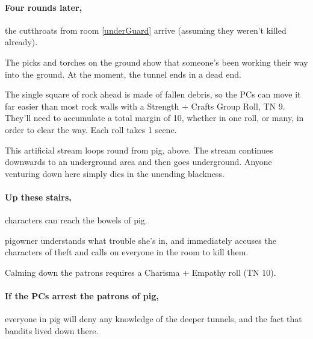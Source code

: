 \begin{multicols}{2}
\sewerking


\paragraph{Four rounds later,}
the cutthroats from room \ref{underGuard} arrive (assuming they weren't killed already).

\label{citadelTunnel}

\begin{boxtext}
  The picks and torches on the ground show that someone's been working their way into the ground.  At the moment, the tunnel ends in a dead end.
\end{boxtext}
 
The single square of rock ahead is made of fallen debris, so the PCs can move it far easier than most rock walls with a Strength + Crafts Group Roll, TN 9.%
\iftoggle{core}%
{\footnote{See the core rules, page \pageref{grouproll}, for Group Rolls.}}%
{}
They'll need to accumulate a total margin of 10, whether in one roll, or many, in order to clear the way.
Each roll takes 1 scene.

\label{slidein}

\label{pigexit}

This artificial stream loops round from \gls{pig}, above.
The stream continues downwards to an underground area and then goes underground.
Anyone venturing down here simply dies in the unending blackness.


\paragraph{Up these stairs,}
characters can reach the bowels of \gls{pig}.

\Gls{pigowner} understands what trouble she's in, and immediately accuses the characters of theft and calls on everyone in the room to kill them.

Calming down the patrons requires a Charisma + Empathy roll (TN 10).

\paragraph{If the PCs arrest the patrons of \gls{pig},}
everyone in \gls{pig} will deny any knowledge of the deeper tunnels, and the fact that bandits lived down there.


\end{multicols}
